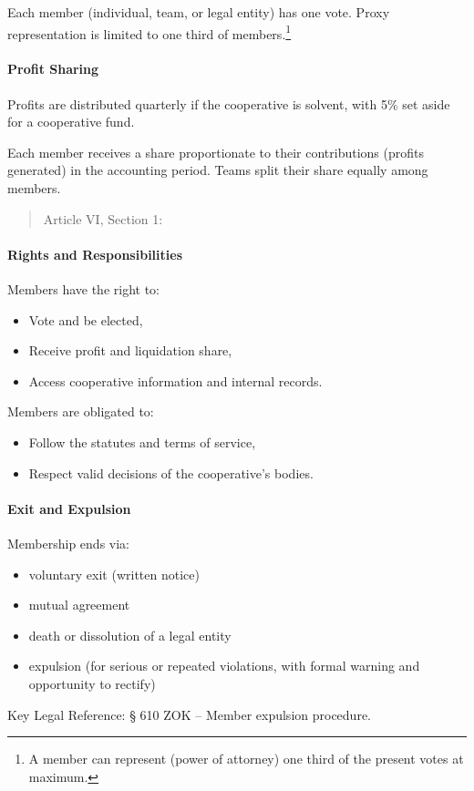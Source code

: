 Each member (individual, team, or legal entity) has one vote. Proxy representation is limited to one third of members.\footnote{A member can represent (power of attorney) one third of the present votes at maximum.}
\paragraph{Profit Sharing}
Profits are distributed quarterly if the cooperative is solvent, with 5\% set aside for a cooperative fund.

Each member receives a share proportionate to their contributions (profits generated) in the accounting period. Teams split their share equally among members.
\begin{quote}
    Article VI, Section 1: 
\end{quote}

\paragraph{Rights and Responsibilities}
Members have the right to:
\begin{itemize}
    \item Vote and be elected,
    \item Receive profit and liquidation share,
    \item Access cooperative information and internal records.
\end{itemize}
Members are obligated to:
\begin{itemize}
    \item Follow the statutes and terms of service,
    \item Respect valid decisions of the cooperative’s bodies.
\end{itemize}
\paragraph{Exit and Expulsion}
Membership ends via:
\begin{itemize}
    \item voluntary exit (written notice)
    \item mutual agreement
    \item death or dissolution of a legal entity
    \item expulsion (for serious or repeated violations, with formal warning and opportunity to rectify)
\end{itemize}
Key Legal Reference: § 610 ZOK – Member expulsion procedure.

